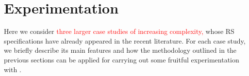 
\section{Experimentation}\label{sec:experiments}

Here we consider 
\textcolor{red}{three larger case studies of increasing complexity,} whose RS specifications have already appeared in the recent literature. For each case study, we briefly describe its main features and how the methodology outlined in the previous sections can be applied for carrying out some fruitful experimentation with \GROOVE.
